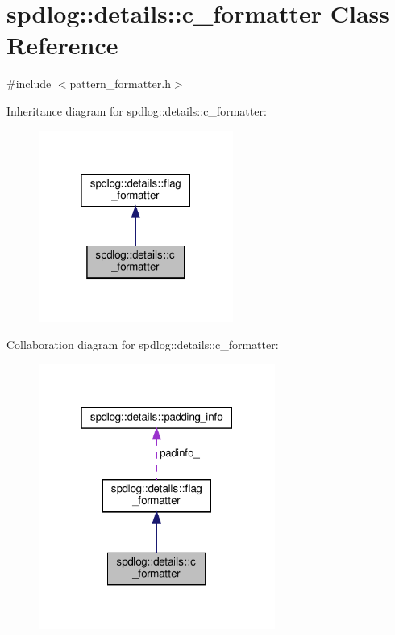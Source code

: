 \hypertarget{classspdlog_1_1details_1_1c__formatter}{}\section{spdlog\+:\+:details\+:\+:c\+\_\+formatter Class Reference}
\label{classspdlog_1_1details_1_1c__formatter}


{\ttfamily \#include $<$pattern\+\_\+formatter.\+h$>$}



Inheritance diagram for spdlog\+:\+:details\+:\+:c\+\_\+formatter\+:
\nopagebreak
\begin{figure}[H]
\begin{center}
\leavevmode
\includegraphics[width=181pt]{classspdlog_1_1details_1_1c__formatter__inherit__graph}
\end{center}
\end{figure}


Collaboration diagram for spdlog\+:\+:details\+:\+:c\+\_\+formatter\+:
\nopagebreak
\begin{figure}[H]
\begin{center}
\leavevmode
\includegraphics[width=220pt]{classspdlog_1_1details_1_1c__formatter__coll__graph}
\end{center}
\end{figure}
